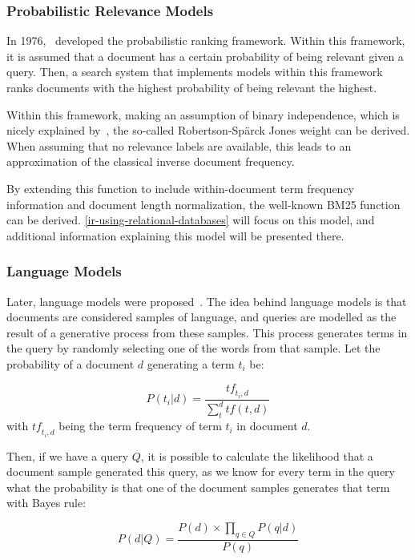 \subsubsection{Probabilistic Relevance Models}
In 1976,~\citeauthor{RSJ} developed the probabilistic ranking framework. Within this framework, it is assumed that a document has a certain probability of being relevant given a query. Then, a search system that implements models within this framework ranks documents with the highest probability of being relevant the highest.

Within this framework, making an assumption of binary independence, which is nicely explained by~\citet{bm25-beyond}, the so-called Robertson-Sp{\"a}rck Jones weight can be derived. When assuming that no relevance labels are available, this leads to an approximation of the classical inverse document frequency.

By extending this function to include within-document term frequency information and document length normalization, the well-known BM25 function can be derived. \cref{ir-using-relational-databases} will focus on this model, and additional information explaining this model will be presented there.

\subsubsection{Language Models}
Later, language models were proposed~\citep{croft_lm, hiemstra_lm, zhai_lm}. The idea behind language models is that documents are considered samples of language, and queries are modelled as the result of a generative process from these samples. This process generates terms in the query by randomly selecting one of the words from that sample. Let the probability of a document $d$ generating a term $t_i$ be:

\begin{equation}
	P(t_i|d) = \frac{\mathit{tf}_{t_i,d}}{\sum_t^d tf(t, d)}
\end{equation}
with $\mathit{tf}_{t_i, d}$ being the term frequency of term $t_i$ in document $d$. 

Then, if we have a query $Q$, it is possible to calculate the likelihood that a document sample generated this query, as we know for every term in the query what the probability is that one of the document samples generates that term with Bayes rule: 

\begin{equation}
	P(d|Q) = \frac{P(d) \times \prod_{q \in Q} P(q | d)}{P(q)}
\end{equation}


